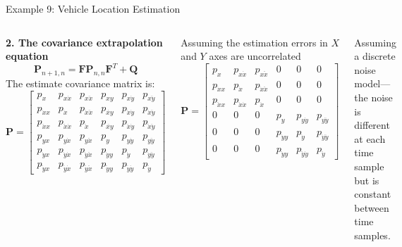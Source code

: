 \begin{frame}{Example 9: Vehicle Location Estimation}
\begin{columns}

\textbf{2. The covariance extrapolation equation}
\begin{equation*}
\mathbf{P}_{n+1,n} = \mathbf{F}\mathbf{P}_{n,n}\mathbf{F}^T + \mathbf{Q}
\end{equation*}
The estimate covariance matrix is:
\[
\mathbf{P} =
\begin{bmatrix}
p_{x} & p_{x\dot{x}} & p_{x\ddot{x}} & p_{xy} & p_{x\dot{y}} & p_{x\ddot{y}} \\
p_{\dot{x}x} & p_{\dot{x}} & p_{\dot{x}\ddot{x}} & p_{\dot{xy}} & p_{\dot{x}\dot{y}} & p_{\dot{x}\ddot{y}} \\
p_{\ddot{x}x} & p_{\ddot{x}\dot{x}} & p_{\ddot{x}} & p_{\ddot{xy}} & p_{\ddot{x}\dot{y}} & p_{\ddot{x}\ddot{y}} \\
p_{yx} & p_{y\dot{x}} & p_{y\ddot{x}} & p_{y} & p_{y\dot{y}} & p_{y\ddot{y}} \\
p_{\dot{y}x} & p_{\dot{y}\dot{x}} & p_{\dot{y}\ddot{x}} & p_{\dot{y}y} & p_{\dot{y}} & p_{\dot{y}\ddot{y}} \\
p_{\ddot{y}x} & p_{\ddot{y}\dot{x}} & p_{\ddot{y}\ddot{x}} & p_{\ddot{y}y} & p_{\ddot{y}\dot{y}} & p_{\ddot{y}}
\end{bmatrix}
\]

Assuming the estimation errors in $X$ and $Y$ axes are uncorrelated
\[
\mathbf{P} =
\begin{bmatrix}
p_{x} & p_{x\dot{x}} & p_{x\ddot{x}} & 0 & 0 & 0 \\
p_{\dot{x}x} & p_{\dot{x}} & p_{\dot{x}\ddot{x}} & 0 & 0 & 0 \\
p_{\ddot{x}x} & p_{\ddot{x}\dot{x}} & p_{\ddot{x}} & 0 & 0 & 0 \\
0 & 0 & 0 & p_{y} & p_{y\dot{y}} & p_{y\ddot{y}} \\
0 & 0 & 0 & p_{\dot{y}y} & p_{\dot{y}} & p_{\dot{y}\ddot{y}} \\
0 & 0 & 0 & p_{\ddot{y}y} & p_{\ddot{y}\dot{y}} & p_{\ddot{y}}
\end{bmatrix}
\]

\textbf{}
Assuming a discrete noise model---the noise is different at each time sample but is constant between time samples.


\end{columns}
\end{frame}

